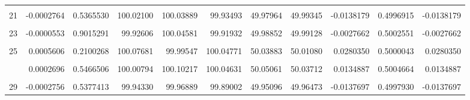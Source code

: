 \documentclass[a4paper]{tufte-handout}
\begin{document}
\begin{table}
{\begin{tabular}[t]{rrrrrrrrrrr}
\cellcolor{gray!6}{20} & \cellcolor{gray!6}{-0.0001323} & \cellcolor{gray!6}{0.7673047} & \cellcolor{gray!6}{99.92560} & \cellcolor{gray!6}{99.96056} & \cellcolor{gray!6}{99.95999} & \cellcolor{gray!6}{49.97352} & \cellcolor{gray!6}{49.98014} & \cellcolor{gray!6}{-0.0066140} & \cellcolor{gray!6}{0.5001073} & \cellcolor{gray!6}{-0.0066140}\\
21 & -0.0002764 & 0.5365530 & 100.02100 & 100.03889 & 99.93493 & 49.97964 & 49.99345 & -0.0138179 & 0.4996915 & -0.0138179\\
\addlinespace
\cellcolor{gray!6}{22} & \cellcolor{gray!6}{0.0005443} & \cellcolor{gray!6}{0.2235309} & \cellcolor{gray!6}{100.07907} & \cellcolor{gray!6}{100.06634} & \cellcolor{gray!6}{100.10017} & \cellcolor{gray!6}{50.06887} & \cellcolor{gray!6}{50.04163} & \cellcolor{gray!6}{0.0272399} & \cellcolor{gray!6}{0.5002931} & \cellcolor{gray!6}{0.0272399}\\
23 & -0.0000553 & 0.9015291 & 99.92606 & 100.04581 & 99.91932 & 49.98852 & 49.99128 & -0.0027662 & 0.5002551 & -0.0027662\\
\cellcolor{gray!6}{24} & \cellcolor{gray!6}{-0.0006679} & \cellcolor{gray!6}{0.1353417} & \cellcolor{gray!6}{100.00815} & \cellcolor{gray!6}{99.94482} & \cellcolor{gray!6}{99.99480} & \cellcolor{gray!6}{49.95152} & \cellcolor{gray!6}{49.98491} & \cellcolor{gray!6}{-0.0333826} & \cellcolor{gray!6}{0.4994745} & \cellcolor{gray!6}{-0.0333826}\\
25 & 0.0005606 & 0.2100268 & 100.07681 & 99.99547 & 100.04771 & 50.03883 & 50.01080 & 0.0280350 & 0.5000043 & 0.0280350\\
\cellcolor{gray!6}{26} & \cellcolor{gray!6}{0.0001202} & \cellcolor{gray!6}{0.7881156} & \cellcolor{gray!6}{100.16421} & \cellcolor{gray!6}{100.13795} & \cellcolor{gray!6}{100.28389} & \cellcolor{gray!6}{50.11148} & \cellcolor{gray!6}{50.10546} & \cellcolor{gray!6}{0.0060223} & \cellcolor{gray!6}{0.5002933} & \cellcolor{gray!6}{0.0060223}\\
\addlinespace
27 & 0.0002696 & 0.5466506 & 100.00794 & 100.10217 & 100.04631 & 50.05061 & 50.03712 & 0.0134887 & 0.5004664 & 0.0134887\\
\cellcolor{gray!6}{28} & \cellcolor{gray!6}{0.0002009} & \cellcolor{gray!6}{0.6532036} & \cellcolor{gray!6}{99.84813} & \cellcolor{gray!6}{99.85202} & \cellcolor{gray!6}{99.85932} & \cellcolor{gray!6}{49.93787} & \cellcolor{gray!6}{49.92784} & \cellcolor{gray!6}{0.0100325} & \cellcolor{gray!6}{0.5001382} & \cellcolor{gray!6}{0.0100325}\\
29 & -0.0002756 & 0.5377413 & 99.94330 & 99.96889 & 99.89002 & 49.95096 & 49.96473 & -0.0137697 & 0.4997930 & -0.0137697\\

\end{tabular}}
\end{table}
\end{document}
